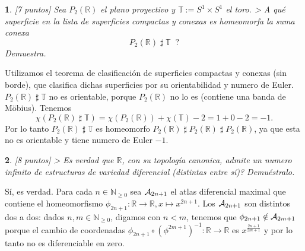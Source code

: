\documentclass[12pt,a4paper]{report}
\theoremstyle{definition}
\newtheorem{ex}{}
\newcommand{\NN}{\ensuremath{\mathbb N}}
\newcommand{\TT}{\ensuremath{\mathbb T}}
\newcommand{\RR}{\ensuremath{\mathbb R}}
\begin{document}
\begin{ex}\emph{ [7 puntos]
Sea $P_2(\RR)$ el plano proyectivo y $\TT:=S^1\times S^1$ el toro. > A qu\'e superficie en la lista de superficies compactas y conexas es homeomorfa la suma conexa $$P_2(\RR) \; \sharp \;  \TT\;\;?$$  
Demuestra.\\}

Utilizamos el    teorema de clasificaci\'on de superficies compactas y conexas (sin borde), que clasifica dichas superficies por su orientabilidad y numero de Euler. 
$P_2(\RR) \; \sharp \;  \TT$ no es orientable, porque $P_2(\RR)$ no lo es (contiene una banda de M\"obius). Tenemos $$\chi(P_2(\RR) \; \sharp \;  \TT)=
\chi(P_2(\RR))+ \chi(\TT)-2=1+0-2=-1.$$
Por lo tanto $P_2(\RR) \; \sharp \;  \TT$ es homeomorfo 
 $P_2(\RR)  \; \sharp \;  P_2(\RR)  \; \sharp \;  P_2(\RR)$, ya que esta no es orientable y tiene numero de Euler $-1$.
\end{ex}
 

\begin{ex} \emph{ [8 puntos]
> Es verdad que $\RR$, con su topolog\'ia canonica, admite un numero infinito de estructuras  de variedad diferencial (distintas entre s\'i)? Demu\'estralo.\\
}

S\'i, es verdad. Para cada $n\in \NN_{\ge 0}$ sea ${\cal A}_{2n+1}$
el atlas diferencial maximal que contiene el homeomorfismo $\phi_{2n+1} \colon \RR \to \RR, x \mapsto x^{2n+1}$. Los ${\cal A}_{2n+1}$ son distintos dos a dos: dados $n,m \in \NN_{\ge 0}$, digamos con $n<m$, tenemos que $\phi_{2n+1} \notin {\cal A}_{2m+1}$ porque el cambio de coordenadas $\phi_{2n+1}\circ(\phi^{2m+1})^{-1} \colon \RR \to \RR$ es $x^{\frac{2n+1}{2m+1}}$ y por lo tanto no es diferenciable en zero. 
\end{ex}
\end{document}
